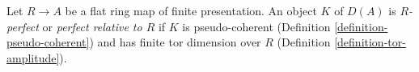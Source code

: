 \begin{definition}
\label{definition-relatively-perfect}
Let $R \to A$ be a flat ring map of finite presentation.
An object $K$ of $D(A)$ is {\it $R$-perfect} or {\it perfect relative to $R$}
if $K$ is pseudo-coherent
(Definition \ref{definition-pseudo-coherent})
and has finite tor dimension over $R$
(Definition \ref{definition-tor-amplitude}).
\end{definition}